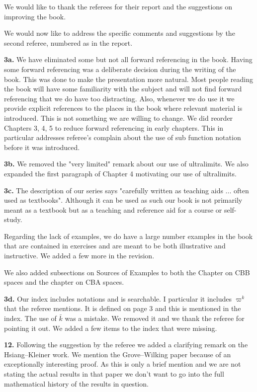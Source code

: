 \documentclass[11pt]{amsart}
\begin{document}
We would like to thank the referees for their report and the suggestions on improving the book.

We would now like to address the specific comments and suggestions by the second referee, numbered as in the report.



{\bf 3a.} 
We have eliminated some but not all forward referencing in the book.
Having some forward referencing was a deliberate decision during the writing of the book. This was done to make the presentation more natural. Most people reading the book will have some familiarity with the subject and will not find forward referencing that we do have
too distracting. Also, whenever we do use it we provide explicit references to the places in the book where relevant material is introduced. This is not something we are willing to change. We did reorder Chapters 3, 4, 5 to reduce forward referencing in early chapters. This in particular addresses
referee's complain about the use of sub function notation before it was introduced.

{\bf 3b.} 
We removed the "very limited" remark about our use of ultralimits. We also expanded the first paragraph of Chapter 4 motivating our use of ultralimits. 

{\bf 3c.}
The description of our series says "carefully written as teaching aids ... often used as textbooks".  Although it can be used as such our book is not primarily meant as a textbook but as a teaching and reference aid for a course or self-study.

Regarding the lack of examples, we do have a large number examples in the book that are contained in exercises and are meant to be both illustrative and instructive. We added a few more in the revision.

We also added subsections on Sources of Examples to both the Chapter on CBB spaces and the chapter on CBA spaces.

{\bf 3d. }
Our index includes notations and is searchable. I particular it includes $\varpi^k$ that the referee mentions. It is defined on page 3 and this is mentioned in the index.
The use of $\bar k$ was a mistake. We  removed it and we thank the referee for pointing it out.  We added a few  items to the index that were missing. 

{\bf 12.}
Following the suggestion by the referee we added a clarifying remark on the Hsiang--Kleiner work.
We mention the Grove--Wilking paper because of an exceptionally interesting proof. As this is only a brief mention and we are not stating the actual results in that paper we don't want to go into the full mathematical history of the results in question.
\end{document}
